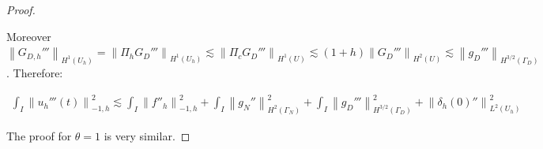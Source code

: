 \documentclass[english,a4paper,9pt,oneside]{scrbook}	%
\theoremstyle{break}
\newenvironment{mproof}[1][\proofname]{%
  \begin{proof}[#1]$ $\par\nobreak\ignorespaces
}{%
  \end{proof}
}
\renewcommand*{\proofname}{Proof}
\theoremstyle{remark}
\newcommand{\norm}[1]{\left\lVert#1\right\rVert}
\begin{document}
\begin{appendices}
\begin{mproof}
Moreover $\norm{G_{D,h}'''}_{H^1(U_h)} = \norm{\Pi_h G_D'''}_{H^1(U_h)}\lesssim  \norm{\Pi_c G_D'''}_{H^1(U)}\lesssim (1+h)\norm{G_D'''}_{H^2(U)}\lesssim \norm{g_D'''}_{H^{3/2}(\Gamma_D)}$.
Therefore:

\begin{align*}
	\int_I \norm{u_h'''(t)}_{-1,h}^2\lesssim \int_I \norm{f''_h}_{-1,h}^2+\int_I\norm{ g_{N}''}_{H^{2}(\Gamma_{N})}^2 + \int_I\norm{g_D'''}_{H^{3/2}(\Gamma_D)}^2 + \norm{\delta_{h}(0)''}_{L^2(U_h)}^2
\end{align*}


The proof for $\theta=1$ is very similar.

%
%
%
%
%
%
%

%
%
%
%


\end{mproof}
\end{appendices}
\end{document}
